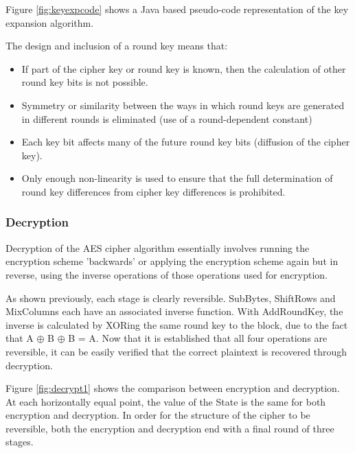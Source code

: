 \documentclass[a4paper,12pt]{report}
\begin{document}
Figure \ref{fig:keyexpcode} shows a Java based pseudo-code representation of the key expansion algorithm.

The design and inclusion of a round key means that:
\begin{itemize}
 \item If part of the cipher key or round key is known, then the calculation of other round key bits is not possible.
 \item Symmetry or similarity between the ways in which round keys are generated in different rounds is eliminated (use of a round-dependent constant)
 \item Each key bit affects many of the future round key bits (diffusion of the cipher key).
 \item Only enough non-linearity is used to ensure that the full determination of round key differences from cipher key differences is prohibited. 
\end{itemize}

\subsubsection{Decryption}


Decryption of the AES cipher algorithm essentially involves running the encryption scheme 'backwards' or applying the encryption scheme again but in reverse, using the inverse operations of those operations used for encryption. 

As shown previously, each stage is clearly reversible. SubBytes, ShiftRows and MixColumns each have an associated inverse function. With AddRoundKey, the inverse is calculated by XORing the same round key to the block, due to the fact that A $\oplus$ B $\oplus$ B = A. Now that it is established that all four operations are reversible, it can be easily verified that the correct plaintext is recovered through decryption. 

Figure \ref{fig:decrypt1} shows the comparison between encryption and decryption. At each horizontally equal point, the value of the State is the same for both encryption and decryption. In order for the structure of the cipher to be reversible, both the encryption and decryption end with a final round of three stages. 
\end{document}
